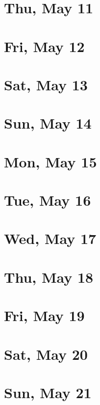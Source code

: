 	\section{Thu, May 11}
		
	\section{Fri, May 12}
		
	\section{Sat, May 13}
		
	\section{Sun, May 14}
		
	\section{Mon, May 15}
		
	\section{Tue, May 16}
		
	\section{Wed, May 17}
		
	\section{Thu, May 18}
		
	\section{Fri, May 19}
		
	\section{Sat, May 20}
		
	\section{Sun, May 21}
		
